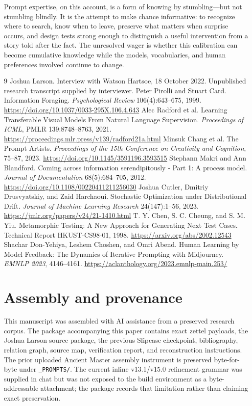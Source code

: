 \documentclass[11pt]{article}
\begin{document}
Prompt expertise, on this account, is a form of knowing by stumbling—but not stumbling blindly. It is the attempt to make chance informative: to recognize where to search, know when to leave, preserve what matters when surprise occurs, and design tests strong enough to distinguish a useful intervention from a story told after the fact. The unresolved wager is whether this calibration can become cumulative knowledge while the models, vocabularies, and human preferences involved continue to change.

\begin{thebibliography}{9}
 Joshua Larson. Interview with Watson Hartsoe, 18 October 2022. Unpublished research transcript supplied by interviewer.
 Peter Pirolli and Stuart Card. Information Foraging. \emph{Psychological Review} 106(4):643--675, 1999. \url{https://doi.org/10.1037/0033-295X.106.4.643}
 Alec Radford et al. Learning Transferable Visual Models From Natural Language Supervision. \emph{Proceedings of ICML}, PMLR 139:8748--8763, 2021. \url{https://proceedings.mlr.press/v139/radford21a.html}
 Minsuk Chang et al. The Prompt Artists. \emph{Proceedings of the 15th Conference on Creativity and Cognition}, 75--87, 2023. \url{https://doi.org/10.1145/3591196.3593515}
 Stephann Makri and Ann Blandford. Coming across information serendipitously - Part 1: A process model. \emph{Journal of Documentation} 68(5):684--705, 2012. \url{https://doi.org/10.1108/00220411211256030}
 Joshua Cutler, Dmitriy Drusvyatskiy, and Zaid Harchaoui. Stochastic Optimization under Distributional Drift. \emph{Journal of Machine Learning Research} 24(147):1--56, 2023. \url{https://jmlr.org/papers/v24/21-1410.html}
 T. Y. Chen, S. C. Cheung, and S. M. Yiu. Metamorphic Testing: A New Approach for Generating Next Test Cases. Technical Report HKUST-CS98-01, 1998. \url{https://arxiv.org/abs/2002.12543}
 Shachar Don-Yehiya, Leshem Choshen, and Omri Abend. Human Learning by Model Feedback: The Dynamics of Iterative Prompting with Midjourney. \emph{EMNLP 2023}, 4146--4161. \url{https://aclanthology.org/2023.emnlp-main.253/}
\end{thebibliography}

\appendix
\section{Assembly and provenance}
This manuscript was assembled with AI assistance from a preserved research corpus. The package accompanying this paper contains exact zettel payloads, the Joshua Larson source package, the previous Slipcase checkpoint, bibliography, relation graph, source map, verification report, and reconstruction instructions. The prior uploaded Ancient Master assembly instrument is preserved byte-for-byte under \texttt{\_PROMPTS/}. The current inline v13.1/v15.0 refinement grammar was supplied in chat but was not exposed to the build environment as a byte-addressable attachment; the package records that limitation rather than claiming exact preservation.
\end{document}
